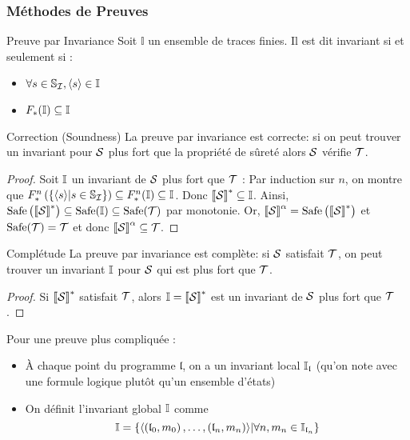 \documentclass{cours}
\begin{document}
\subsubsection{Méthodes de Preuves}
\begin{définition}{Preuve par Invariance}{}
    Soit $\mathbb{I}$ un ensemble de traces finies. Il est dit invariant si et seulement si :
    \begin{itemize}
        \item $\forall s \in \mathbb{S}_{\mathcal{I}}, \left\langle s \right\rangle \in \mathbb{I}$
        \item $F_{*}(\mathbb{I}) \subseteq \mathbb{I}$
    \end{itemize}
\end{définition}
\begin{théorème}{Correction (Soundness)}{}
    La preuve par invariance est correcte: si on peut trouver un invariant pour $\mathcal{S}$ plus fort que la propriété de sûreté alors $\mathcal{S}$ vérifie $\mathcal{T}$. 
\end{théorème}
\begin{proof}
    Soit $\mathbb{I}$ un invariant de $\mathcal{S}$ plus fort que $\mathcal{T}$ : 
        Par induction sur $n$, on montre que $F_{*}^{n} \left(\left\{\left\langle s \right\rangle \middle| s\in \mathbb{S}_{\mathcal{I}}\right\}\right)\subseteq F_{*}^{n}(\mathbb{I}) \subseteq \mathbb{I}$.
        Donc $\left\llbracket \mathcal{S} \right\rrbracket^{*} \subseteq \mathbb{I}$.
        Ainsi, $\mathrm{Safe}\left(\left\llbracket \mathcal{S} \right\rrbracket^{*}\right) \subseteq \rm Safe(\mathbb{I}) \subseteq Safe(\mathcal{T})$ par monotonie.
        Or, $\left\llbracket \mathcal{S} \right\rrbracket^{\alpha} = {\rm Safe}\left(\left\llbracket \mathcal{S} \right\rrbracket^{*}\right)$ et ${\rm Safe}(\mathcal{T}) = \mathcal{T}$ et donc $\left\llbracket \mathcal{S} \right\rrbracket^{\alpha}\subseteq \mathcal{T}$.
\end{proof}

\begin{théorème}{Complétude}{}
    La preuve par invariance est complète: si $\mathcal{S}$ satisfait $\mathcal{T}$, on peut trouver un invariant $\mathbb{I}$ pour $\mathcal{S}$ qui est plus fort que $\mathcal{T}$.
\end{théorème}
\begin{proof}
    Si $\left\llbracket \mathcal{S} \right\rrbracket^{*}$ satisfait $\mathcal{T}$, alors $\mathbb{I} = \left\llbracket \mathcal{S} \right\rrbracket^{*}$ est un invariant de $\mathcal{S}$ plus fort que $\mathcal{T}$.
\end{proof}

Pour une preuve plus compliquée : 
\begin{itemize}
    \item À chaque point du programme $\mathfrak{l}$, on a un invariant local $\mathbb{I}_{\mathfrak{l}}$ (qu'on note avec une formule logique plutôt qu'un ensemble d'états)
    \item On définit l'invariant global $\mathbb{I}$ comme 
    \[
        \mathbb{I} = \left\{\left\langle \left(\mathfrak{l}_{0}, m_{0}\right), \ldots, \left(\mathfrak{l}_{n}, m_{n}\right) \right\rangle\middle| \forall n, m_{n} \in \mathbb{I}_{\mathfrak{l}_{n}}\right\}
    \]
\end{itemize}
\end{document}
